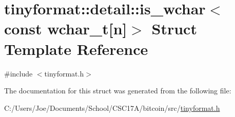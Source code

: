 \hypertarget{structtinyformat_1_1detail_1_1is__wchar_3_01const_01wchar__t[n]_4}{}\section{tinyformat\+:\+:detail\+:\+:is\+\_\+wchar$<$ const wchar\+\_\+t\mbox{[}n\mbox{]}$>$ Struct Template Reference}
\label{structtinyformat_1_1detail_1_1is__wchar_3_01const_01wchar__t[n]_4}


{\ttfamily \#include $<$tinyformat.\+h$>$}



The documentation for this struct was generated from the following file\+:\begin{DoxyCompactItemize}
\item 
C\+:/\+Users/\+Joe/\+Documents/\+School/\+C\+S\+C17\+A/bitcoin/src/\hyperlink{tinyformat_8h}{tinyformat.\+h}\end{DoxyCompactItemize}
